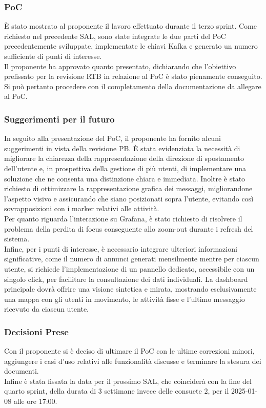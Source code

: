 \documentclass[10pt]{article}
\begin{document}
    \subsubsection{PoC}
    È stato mostrato al proponente il lavoro effettuato durante il terzo sprint. Come richiesto nel precedente SAL, sono state integrate le due parti del PoC precedentemente sviluppate, implementate le chiavi Kafka e generato un numero sufficiente di punti di interesse.\\
    Il proponente ha approvato quanto presentato, dichiarando che l'obiettivo prefissato per la revisione RTB in relazione al PoC è stato pienamente conseguito. Si può pertanto procedere con il completamento della documentazione da allegare al PoC.

    \subsubsection{Suggerimenti per il futuro}
    In seguito alla presentazione del PoC, il proponente ha fornito alcuni suggerimenti in vista della revisione PB. È stata evidenziata la necessità di migliorare la chiarezza della rappresentazione della direzione di spostamento dell’utente e, in prospettiva della gestione di più utenti, di implementare una soluzione che ne consenta una distinzione chiara e immediata. Inoltre è stato richiesto di ottimizzare la rappresentazione grafica dei messaggi, migliorandone l’aspetto visivo e assicurando che siano posizionati sopra l’utente, evitando così sovrapposizioni con i marker relativi alle attività.\\
    Per quanto riguarda l’interazione su Grafana, è stato richiesto di risolvere il problema della perdita di focus conseguente allo zoom-out durante i refresh del sistema.\\
    Infine, per i punti di interesse, è necessario integrare ulteriori informazioni significative, come il numero di annunci generati mensilmente mentre per ciascun utente, si richiede l’implementazione di un pannello dedicato, accessibile con un singolo click, per facilitare la consultazione dei dati individuali. La dashboard principale dovrà offrire una visione sintetica e mirata, mostrando esclusivamente una mappa con gli utenti in movimento, le attività fisse e l'ultimo messaggio ricevuto da ciascun utente.
    
    \subsubsection{Decisioni Prese}
    Con il proponente si è deciso di ultimare il PoC con le ultime correzioni minori, aggiungere i casi d'uso relativi alle funzionalità discusse e terminare la stesura dei documenti.\\
    Infine è stata fissata la data per il prossimo SAL, che coinciderà con la fine del quarto sprint, della durata di 3 settimane invece delle consuete 2, per il 2025-01-08 alle ore 17:00.
\end{document}
